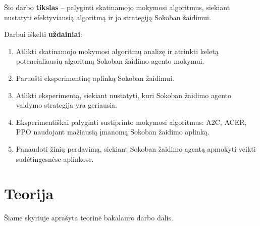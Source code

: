 \documentclass{VUMIFPSbakalaurinis}
\begin{document}
\label{subsec:tikslas}
{
	Šio darbo \textbf{tikslas} -- palyginti skatinamojo mokymosi algoritmus, siekiant nustatyti efektyviausią algoritmą ir jo strategiją Sokoban žaidimui.
}
\label{subsec:uzdaviniai}
{
	Darbui iškelti \textbf{uždainiai}:
	\begin{enumerate}
		\item Atlikti skatinamojo mokymosi algoritmų analizę ir atrinkti keletą potencialiausių algoritmų Sokoban žaidimo agento mokymui.
		\item Paruošti eksperimentinę aplinką Sokoban žaidimui.
		\item Atlikti eksperimentą, siekiant nustatyti, kuri Sokoban žaidimo agento valdymo strategija yra geriausia.
		\item Eksperimentiškai palyginti sustiprinto mokymosi algoritmus: A2C, ACER, PPO naudojant mažiausią įmanomą Sokoban žaidimo aplinką.
		\item Panaudoti žinių perdavimą, siekiant Sokoban žaidimo agentą apmokyti veikti sudėtingesnėse aplinkose.
	\end{enumerate}
}
\section{Teorija}\label{sec:1}
Šiame skyriuje aprašyta teorinė bakalauro darbo dalis.
\end{document}
